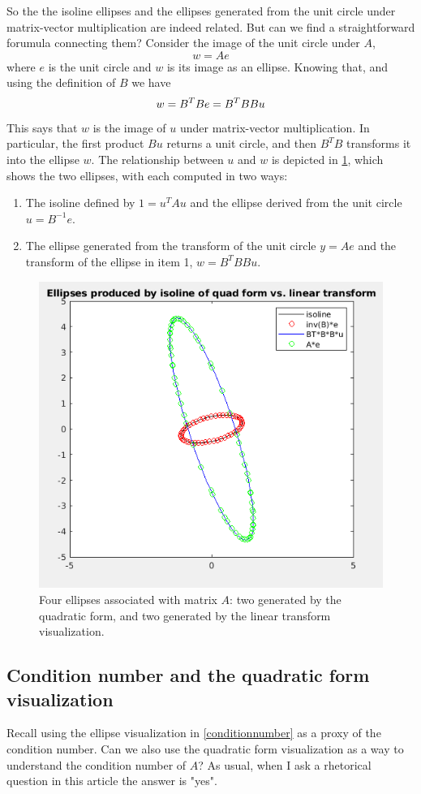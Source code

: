 \documentclass[onefignum,onetabnum]{siamart190516}
\begin{document}
So the the isoline ellipses and the ellipses generated from the unit circle
under matrix-vector multiplication are indeed related.  But can we find a straightforward
forumula connecting them?  Consider the image of the unit circle under $A$,
$$
w = A e
$$
where $e$ is the unit circle and $w$ is its image as an ellipse.  Knowing that, and using
the definition of $B$ we have
$$
w = B^T B e \\
=  B^T B B u
$$
This says that $w$ is the image of $u$ under matrix-vector multiplication.  In particular,
the first product $B u$ returns a unit circle, and then $B^T B$ transforms it into
the ellipse $w$.  The relationship between $u$ and $w$ 
is depicted in \cref{fig:IsolineVsLinTransform}, which shows the two ellipses,
with each computed in two ways:
\begin{enumerate}
	\item The isoline defined by $1 = u^T A u$ and the ellipse
	derived from the unit circle $u = B^{-1} e$.
	\item The ellipse generated from the transform of the unit circle
	$y = A e$ and the transform of the ellipse in item 1, 
	$w = B^{T} B B u$.
\end{enumerate}
\begin{figure}[bht]
	\centering
	\includegraphics[width=0.7\columnwidth]{IsolineVsLinTransform.png}
	\caption{Four ellipses associated with matrix $A$:  two generated
		by the quadratic form, and two generated by the
		linear transform visualization.}
	\label{fig:IsolineVsLinTransform}
\end{figure}

\subsection{Condition number and the quadratic form visualization}
Recall using the ellipse visualization in \cref{conditionnumber} as 
a proxy of the condition number.  Can we also use the quadratic form
visualization as a way to understand the condition number of $A$?  As usual,
when I ask a rhetorical question in this article the answer is "yes".
\end{document}
